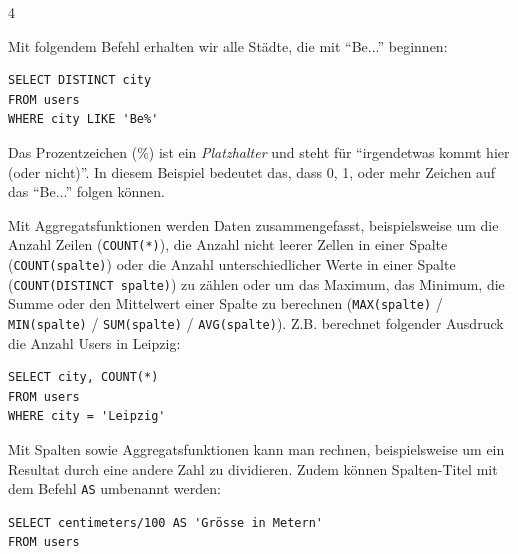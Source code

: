 \begin{landscape}
\begin{multicols*}{4}
\begin{cheatSheetBox}[title=Ungefähre Treffer: \texorpdfstring{\lstinline|LIKE|}{LIKE}]
Mit folgendem Befehl erhalten wir alle Städte, die mit ``Be...'' beginnen:
\begin{lstlisting}
SELECT DISTINCT city 
FROM users 
WHERE city LIKE 'Be%'
\end{lstlisting}
Das Prozentzeichen (\%) ist ein \textit{Platzhalter} und steht für \enquote{irgendetwas kommt hier (oder nicht)}. In diesem Beispiel bedeutet das, dass 0, 1, oder mehr Zeichen auf das \enquote{Be...} folgen können.
\end{cheatSheetBox}
%
\begin{cheatSheetBox}[title=Aggregatsfunktionen]
Mit Aggregatsfunktionen werden Daten zusammengefasst, beispielsweise um die Anzahl Zeilen (\lstinline|COUNT(*)|), die Anzahl nicht leerer Zellen in einer Spalte (\lstinline|COUNT(spalte)|) oder die Anzahl unterschiedlicher Werte in einer Spalte (\lstinline|COUNT(DISTINCT spalte)|) zu zählen oder um das Maximum, das Minimum, die Summe oder den Mittelwert einer Spalte zu berechnen (\lstinline|MAX(spalte)| / \lstinline|MIN(spalte)| / \lstinline|SUM(spalte)| / \lstinline|AVG(spalte)|). Z.B. berechnet folgender Ausdruck die Anzahl Users in Leipzig:
\begin{lstlisting}
SELECT city, COUNT(*)
FROM users 
WHERE city = 'Leipzig'
\end{lstlisting}
\end{cheatSheetBox}

\begin{cheatSheetBox}[title=Rechnen und umbenennen: \texorpdfstring{\lstinline|AS|}{AS}]
Mit Spalten sowie Aggregatsfunktionen kann man rechnen, beispielsweise um ein Resultat durch eine andere Zahl zu dividieren. Zudem können Spalten-Titel mit dem Befehl \lstinline|AS| umbenannt werden:
\begin{lstlisting}
SELECT centimeters/100 AS 'Grösse in Metern'
FROM users 
\end{lstlisting}
\end{cheatSheetBox}


\end{multicols*}
\end{landscape}
